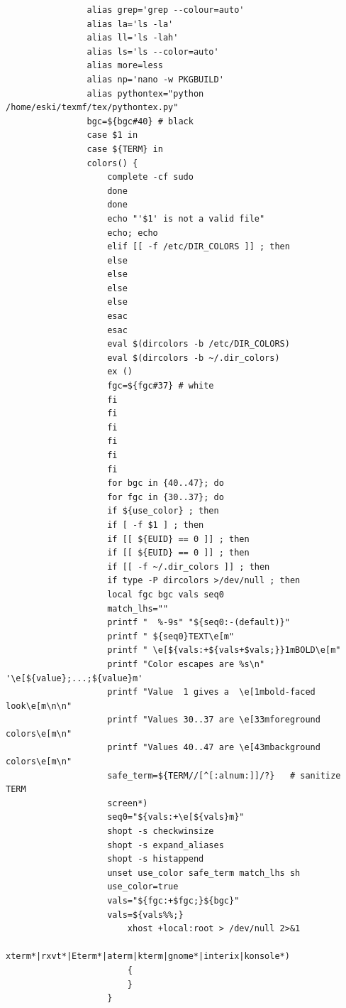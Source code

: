 \documentclass{article}
\begin{document}
\begin{enumerate}
\begin{verbatim}
				alias grep='grep --colour=auto'
				alias la='ls -la'
				alias ll='ls -lah'
				alias ls='ls --color=auto'
				alias more=less
				alias np='nano -w PKGBUILD'
				alias pythontex="python /home/eski/texmf/tex/pythontex.py"
				bgc=${bgc#40} # black
				case $1 in
				case ${TERM} in
				colors() {
					complete -cf sudo
					done
					done
					echo "'$1' is not a valid file"
					echo; echo
					elif [[ -f /etc/DIR_COLORS ]] ; then
					else
					else
					else
					else
					esac
					esac
					eval $(dircolors -b /etc/DIR_COLORS)
					eval $(dircolors -b ~/.dir_colors)
					ex ()
					fgc=${fgc#37} # white
					fi
					fi
					fi
					fi
					fi
					fi
					for bgc in {40..47}; do
					for fgc in {30..37}; do
					if ${use_color} ; then
					if [ -f $1 ] ; then
					if [[ ${EUID} == 0 ]] ; then
					if [[ ${EUID} == 0 ]] ; then
					if [[ -f ~/.dir_colors ]] ; then
					if type -P dircolors >/dev/null ; then
					local fgc bgc vals seq0
					match_lhs=""
					printf "  %-9s" "${seq0:-(default)}"
					printf " ${seq0}TEXT\e[m"
					printf " \e[${vals:+${vals+$vals;}}1mBOLD\e[m"
					printf "Color escapes are %s\n" '\e[${value};...;${value}m'
					printf "Value  1 gives a  \e[1mbold-faced look\e[m\n\n"
					printf "Values 30..37 are \e[33mforeground colors\e[m\n"
					printf "Values 40..47 are \e[43mbackground colors\e[m\n"
					safe_term=${TERM//[^[:alnum:]]/?}   # sanitize TERM
					screen*)
					seq0="${vals:+\e[${vals}m}"
					shopt -s checkwinsize
					shopt -s expand_aliases
					shopt -s histappend
					unset use_color safe_term match_lhs sh
					use_color=true
					vals="${fgc:+$fgc;}${bgc}"
					vals=${vals%%;}
						xhost +local:root > /dev/null 2>&1
						xterm*|rxvt*|Eterm*|aterm|kterm|gnome*|interix|konsole*)
						{
						}
					}
	\end{verbatim}
	\end{enumerate}
 
\end{document}
